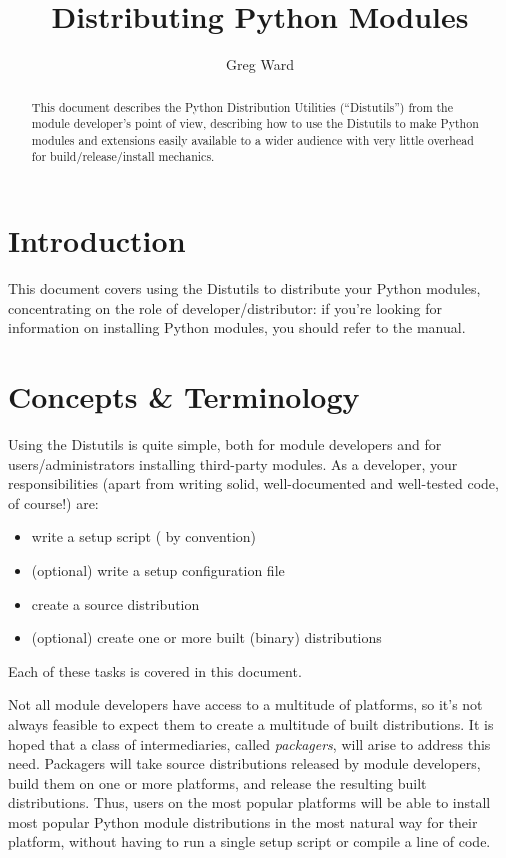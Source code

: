 \documentclass{howto}
\title{Distributing Python Modules}
\author{Greg Ward}
\begin{document}
\maketitle
\begin{abstract}
  \noindent
  This document describes the Python Distribution Utilities
  (``Distutils'') from the module developer's point of view, describing
  how to use the Distutils to make Python modules and extensions easily
  available to a wider audience with very little overhead for
  build/release/install mechanics.
\end{abstract}

%
\tableofcontents


\section{Introduction}
\label{intro}

This document covers using the Distutils to distribute your Python
modules, concentrating on the role of developer/distributor: if
you're looking for information on installing Python modules, you
should refer to the  manual.


\section{Concepts \& Terminology}
\label{concepts}

Using the Distutils is quite simple, both for module developers and for
users/administrators installing third-party modules.  As a developer,
your responsibilities (apart from writing solid, well-documented and
well-tested code, of course!) are:
\begin{itemize}
\item write a setup script ( by convention)
\item (optional) write a setup configuration file
\item create a source distribution
\item (optional) create one or more built (binary) distributions
\end{itemize}
Each of these tasks is covered in this document.

Not all module developers have access to a multitude of platforms, so
it's not always feasible to expect them to create a multitude of built
distributions.  It is hoped that a class of intermediaries, called
\emph{packagers}, will arise to address this need.  Packagers will take
source distributions released by module developers, build them on one or
more platforms, and release the resulting built distributions.  Thus,
users on the most popular platforms will be able to install most popular
Python module distributions in the most natural way for their platform,
without having to run a single setup script or compile a line of code.
\end{document}
